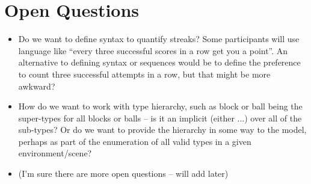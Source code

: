 \documentclass{article}
\begin{document}
\section{Open Questions}
\begin{itemize}
    \item Do we want to define syntax to quantify streaks? Some participants will use language like ``every three successful scores in a row get you a point''. An alternative to defining syntax or sequences would be to define the preference to count three successful attempts in a row, but that might be more awkward?
    
    \item How do we want to work with type hierarchy, such as block or ball being the super-types for all blocks or balls -- is it an implicit (either ...) over all of the sub-types? Or do we want to provide the hierarchy in some way to the model, perhaps as part of the enumeration of all valid types in a given environment/scene?
    
    \item (I'm sure there are more open questions -- will add later)
\end{itemize}
\end{document}
